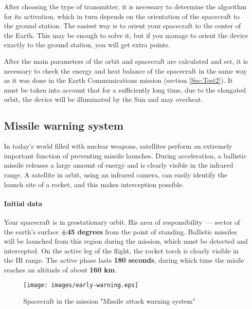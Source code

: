 \documentclass[12pt,a4paper]{article}
\begin{document}
After choosing the type of transmitter, it is necessary to determine the algorithm for its activation, which in turn depends on the orientation of the spacecraft to the ground station. The easiest way is to orient your spacecraft to the center of the Earth. This may be enough to solve it, but if you manage to orient the device exactly to the ground station, you will get extra points.

After the main parameters of the orbit and spacecraft are calculated and set, it is necessary to check the energy and heat balance of the spacecraft in the same way as it was done in the Earth Communications mission (section \ref{Sec:Test2}). It must be taken into account that for a sufficiently long time, due to the elongated orbit, the device will be illuminated by the Sun and may overheat.

\clearpage
\subsection{Missile warning system}

In today's world filled with nuclear weapons, satellites perform an extremely important function of preventing missile launches. During acceleration, a ballistic missile releases a large amount of energy and is clearly visible in the infrared range. A satellite in orbit, using an infrared camera, can easily identify the launch site of a rocket, and this makes interception possible.

\paragraph{Initial data}

Your spacecraft is in geostationary orbit. His area of responsibility~--- sector of the earth's surface \textbf{±45 degrees} from the point of standing. Ballistic missiles will be launched from this region during the mission, which must be detected and intercepted. On the active leg of the flight, the rocket torch is clearly visible in the IR range. The active phase lasts \textbf{180 seconds}, during which time the misile reaches an altitude of about \textbf{160 km}.

\begin{figure}[tbh]
  \begin{center}
    \texttt{[image: images/early-warning.eps]}
    \caption{Spacecraft in the mission "Missile attack warning system"}
    \label{Pic:EWarning}
  \end{center}
\end{figure}
\end{document}
